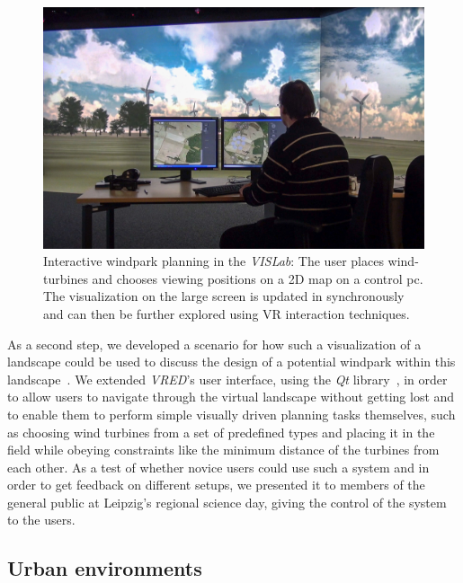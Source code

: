 \documentclass[twocolumn]{svjour3}          %
\begin{document}
\begin{figure}[htb]
  \includegraphics[width=\linewidth]{images/landscape.jpg}
  \caption{Interactive windpark planning in the \emph{VISLab}: The user places wind-turbines and chooses viewing positions on a 2D map on a control pc. The visualization on the large screen is updated in synchronously and can then be further explored using VR interaction techniques.}
\label{fig:landscape}
\end{figure}

As a second step, we developed a scenario for how such a visualization of a landscape could be used to discuss the design of a potential windpark within this landscape~\cite{zehner:windpark}. We extended \emph{VRED}'s user interface, using the \emph{Qt} library~\cite{web:qt}, in order to allow users to navigate through the virtual landscape without getting lost and to enable them to perform simple visually driven planning tasks themselves, such as choosing wind turbines from a set of predefined types and placing it in the field while obeying constraints like the minimum distance of the turbines from each other. As a test of whether novice users could use such a system and in order to get feedback on different setups, we presented it to members of the general public at Leipzig's regional science day, giving the control of the system to the users.

\subsection{Urban environments}
\label{urban-environments}

\end{document}
